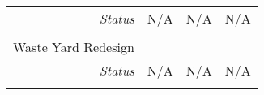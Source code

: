 \begin{tabularx}{\textwidth}{r|X|X|X|}
\multicolumn{1}{|r|}{\cellcolor{ccorangelight}\textit{Status}}                & N/A                                                         & N/A                                                         & N/A                                                         \\
\multicolumn{1}{|r|}{\cellcolor{ccorangelight}\textit{ }}                  &                                                       &                                                       &                                                       \\ \hline
\multicolumn{1}{|V{.2\columnwidth}|}{\cellcolor{ccorangelight}Waste Yard Redesign}          &                                                                  &                                                                  &                                                                  \\
\multicolumn{1}{|r|}{\cellcolor{ccorangelight}\textit{Status}}                & N/A                                                         & N/A                                                         & N/A                                                         \\
\multicolumn{1}{|r|}{\cellcolor{ccorangelight}\textit{ }}                  &                                                       &                                                       &                                                       \\ \hline
\end{tabularx}